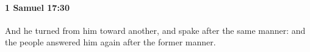 
		\paragraph{1 Samuel 17:30} %
			\label{1SAMUEL-17-30}

			And he turned from him toward another, and spake after the same manner: and the people answered him again after the former manner.


